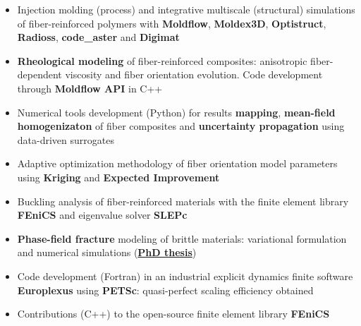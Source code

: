 \documentclass[10pt,a4paper,ragged2e,withhyper]{altacv}
\begin{document}
\begin{paracol}{2}
  \begin{itemize}
    \item Injection molding (process) and integrative multiscale (structural) simulations of fiber-reinforced polymers with \textbf{Moldflow}, \textbf{Moldex3D}, \textbf{Optistruct}, \textbf{Radioss}, \textbf{code\_aster} and \textbf{Digimat}
    \item \textbf{Rheological modeling} of fiber-reinforced composites: anisotropic fiber-dependent viscosity and fiber orientation evolution. Code development through \textbf{Moldflow API} in C++
    \item Numerical tools development (Python) for results \textbf{mapping}, \textbf{mean-field homogenizaton} of fiber composites and \textbf{uncertainty propagation} using data-driven surrogates
    \item Adaptive optimization methodology of fiber orientation model parameters using \textbf{Kriging} and \textbf{Expected Improvement}
    \item Buckling analysis of fiber-reinforced materials with the finite element library \textbf{FEniCS} and eigenvalue solver \textbf{SLEPc}
  \end{itemize}

  \divider

  \begin{itemize}
    \item \textbf{Phase-field fracture} modeling of brittle materials: variational formulation and numerical simulations (\href{https://pastel.archives-ouvertes.fr/tel-01487449}{\faLink\textbf{PhD thesis}})
    \item Code development (Fortran) in an industrial explicit dynamics finite software \textbf{Europlexus} using \textbf{PETSc}: quasi-perfect scaling efficiency obtained
    \item Contributions (C++) to the open-source finite element library \textbf{FEniCS}
  \end{itemize}


\end{paracol}
\end{document}
